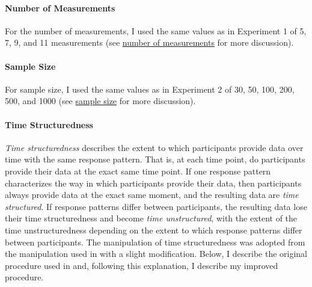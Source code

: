 \documentclass[
12pt, %
twoside,
english]{guelphthesis}
\begin{document}
\hypertarget{number-of-measurements-2}{%
\paragraph{Number of Measurements}\label{number-of-measurements-2}}

For the number of measurements, I used the same values as in Experiment 1 of 5, 7, 9, and 11 measurements (see \protect\hyperlink{number-measurements}{number of measurements} for more discussion).

\hypertarget{sample-size-1}{%
\paragraph{Sample Size}\label{sample-size-1}}

For sample size, I used the same values as in Experiment 2 of 30, 50, 100, 200, 500, and 1000 (see \protect\hyperlink{sample-size}{sample size} for more discussion).

\hypertarget{time-structuredness-1}{%
\paragraph{Time Structuredness}\label{time-structuredness-1}}

\emph{Time structuredness} describes the extent to which participants provide data over time with the same response pattern. That is, at each time point, do participants provide their data at the exact same time point. If one response pattern characterizes the way in which participants provide their data, then participants always provide data at the exact same moment, and the resulting data are \emph{time structured}. If response patterns differ between participants, the resulting data lose their time structuredness and become \emph{time unstructured}, with the extent of the time unstructuredness depending on the extent to which response patterns differ between participants. The manipulation of time structuredness was adopted from the manipulation used in \textcite{coulombe2016} with a slight modification. Below, I describe the original procedure used in \textcite{coulombe2016} and, following this explanation, I describe my improved procedure.
\end{document}
